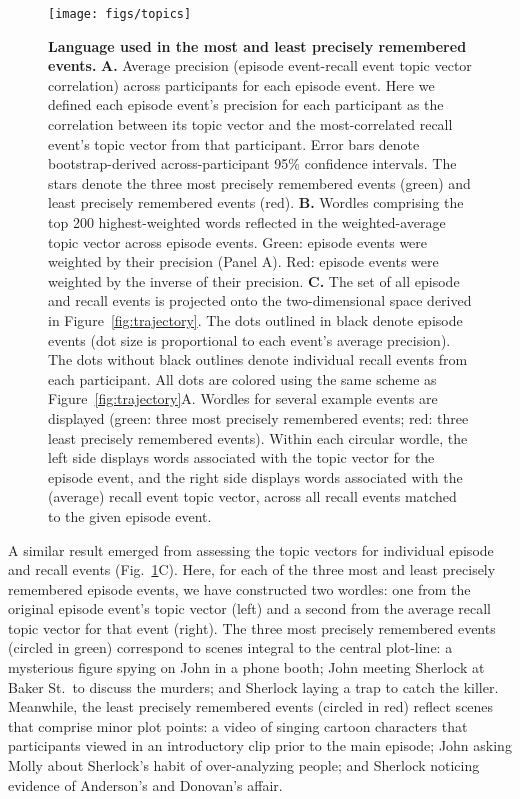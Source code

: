 \documentclass[10pt]{article}
\begin{document}
\begin{figure}
[tp]
\centering
\texttt{[image: figs/topics]}
\caption{\small \textbf{Language used in the most and least precisely remembered events.} \textbf{A.} Average precision (episode event-recall event topic vector correlation) across participants for each episode event.  Here we defined each episode event's precision for each participant as the correlation between its topic vector and the most-correlated recall event's topic vector from that participant.  Error bars denote bootstrap-derived across-participant 95\% confidence intervals.  The stars denote the three most precisely remembered events (green) and least precisely remembered events (red).  \textbf{B.} Wordles comprising the top 200 highest-weighted words reflected in the weighted-average topic vector across episode events.  Green: episode events were weighted by their precision (Panel A).  Red: episode events were weighted by the inverse of their precision.  \textbf{C.}  The set of all episode and recall events is projected onto the two-dimensional space derived in Figure~\ref{fig:trajectory}.  The dots outlined in black denote episode events (dot size is proportional to each event's average precision).  The dots without black outlines denote individual recall events from each participant.  All dots are colored using the same scheme as Figure~\ref{fig:trajectory}A.  Wordles for several example events are displayed (green: three most precisely remembered events; red: three least precisely remembered events).  Within each circular wordle, the left side displays words associated with the topic vector for the episode event, and the right side displays words associated with the (average) recall event topic vector, across all recall events matched to the given episode event.}
\label{fig:topics}

\end{figure}

A similar result emerged from assessing the topic vectors for individual episode and recall events (Fig.~\ref{fig:topics}C).  Here, for each of the three most and least precisely remembered episode events, we have constructed two wordles: one from the original episode event's topic vector (left) and a second from the average recall topic vector for that event (right).  The three most precisely remembered events (circled in green) correspond to scenes integral to the central plot-line: a mysterious figure spying on John in a phone booth; John meeting Sherlock at Baker St.~to discuss the murders; and Sherlock laying a trap to catch the killer.  Meanwhile, the least precisely remembered events (circled in red) reflect scenes that comprise minor plot points: a video of singing cartoon characters that participants viewed in an introductory clip prior to the main episode; John asking Molly about Sherlock's habit of over-analyzing people; and Sherlock noticing evidence of Anderson's and Donovan's affair.
\end{document}
